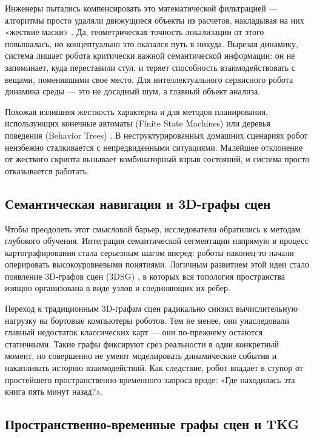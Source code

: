 Инженеры пытались компенсировать это математической фильтрацией — алгоритмы просто удаляли движущиеся объекты из расчетов, накладывая на них «жесткие маски» \cite{ref8}. Да, геометрическая точность локализации от этого повышалась, но концептуально это оказался путь в никуда. Вырезая динамику, система лишает робота критически важной семантической информации: он не запоминает, куда переставили стул, и теряет способность взаимодействовать с вещами, поменявшими свое место. Для интеллектуального сервисного робота динамика среды — это не досадный шум, а главный объект анализа.

Похожая излишняя жесткость характерна и для методов планирования, использующих конечные автоматы (Finite State Machines) или деревья поведения (Behavior Trees) \cite{ref3}. В неструктурированных домашних сценариях робот неизбежно сталкивается с непредвиденными ситуациями. Малейшее отклонение от жесткого скрипта вызывает комбинаторный взрыв состояний, и система просто отказывается работать.

\subsection{Семантическая навигация и 3D-графы сцен}

Чтобы преодолеть этот смысловой барьер, исследователи обратились к методам глубокого обучения. Интеграция семантической сегментации напрямую в процесс картографирования стала серьезным шагом вперед: роботы наконец-то начали оперировать высокоуровневыми понятиями. Логичным развитием этой идеи стало появление 3D-графов сцен (3DSG) \cite{ref10}, в которых вся топология пространства изящно организована в виде узлов и соединяющих их ребер.

Переход к традиционным 3D-графам сцен радикально снизил вычислительную нагрузку на бортовые компьютеры роботов. Тем не менее, они унаследовали главный недостаток классических карт — они по-прежнему остаются статичными. Такие графы фиксируют срез реальности в один конкретный момент, но совершенно не умеют моделировать динамические события и накапливать историю взаимодействий. Как следствие, робот впадает в ступор от простейшего пространственно-временного запроса вроде: «Где находилась эта книга пять минут назад?».

\subsection{Пространственно-временные графы сцен и TKG}

